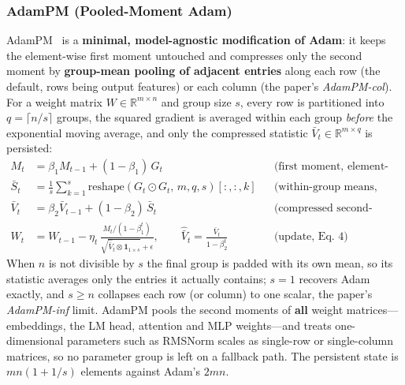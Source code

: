 \subsubsection{AdamPM (Pooled-Moment Adam)}
AdamPM~\citep{ji_adampm_2026} is a \textbf{minimal, model-agnostic modification of
Adam}: it keeps the element-wise first moment untouched and compresses only the
second moment by \textbf{group-mean pooling of adjacent entries} along each row
(the default, rows being output features) or each column (the paper's
\emph{AdamPM-col}). For a weight matrix $W \in \mathbb{R}^{m \times n}$ and group
size $s$, every row is partitioned into $q = \lceil n/s \rceil$ groups, the
squared gradient is averaged within each group \emph{before} the exponential
moving average, and only the compressed statistic
$\bar{V}_t \in \mathbb{R}^{m \times q}$ is persisted:
\begin{align}
M_t &= \beta_1 M_{t-1} + (1-\beta_1)\, G_t
     && \text{(first moment, element-wise, Eq.~1)} \\
\bar{S}_t &= \frac{1}{s}\sum_{k=1}^{s}
     \mathrm{reshape}(G_t \odot G_t,\, m, q, s)[:,:,k]
     && \text{(within-group means, Eq.~2)} \\
\bar{V}_t &= \beta_2 \bar{V}_{t-1} + (1-\beta_2)\, \bar{S}_t
     && \text{(compressed second-moment EMA, Eq.~3)} \\
W_t &= W_{t-1} - \eta_t \,
     \frac{M_t/(1-\beta_1^t)}
          {\sqrt{\hat{\bar{V}}_t \otimes \mathbf{1}_{1\times s}} + \epsilon},
\qquad \hat{\bar{V}}_t = \frac{\bar{V}_t}{1-\beta_2^t}
     && \text{(update, Eq.~4)}
\end{align}
When $n$ is not divisible by $s$ the final group is padded with its own mean, so
its statistic averages only the entries it actually contains; $s{=}1$ recovers
Adam exactly, and $s \ge n$ collapses each row (or column) to one scalar, the
paper's \emph{AdamPM-inf} limit. AdamPM pools the second moments of
\textbf{all} weight matrices---embeddings, the LM head, attention and MLP
weights---and treats one-dimensional parameters such as RMSNorm scales as
single-row or single-column matrices, so no parameter group is left on a
fallback path. The persistent state is $mn(1+1/s)$ elements against Adam's
$2mn$.

